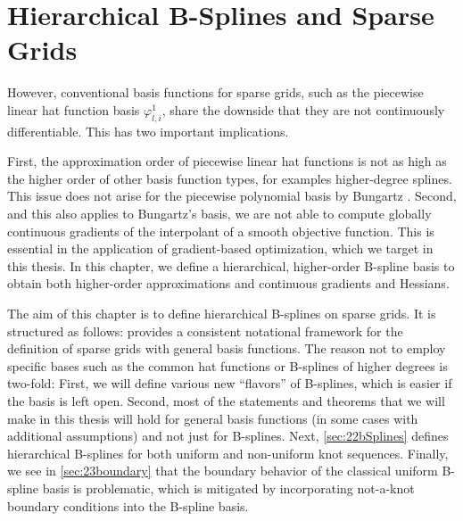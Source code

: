 
\chapter{Hierarchical B-Splines and Sparse Grids}
\label{sec:20sparseGrids}




However, conventional basis functions for sparse grids,
such as the piecewise linear hat function basis $\varphi_{l,i}^1$,
share the downside that they are not continuously differentiable.
This has two important implications.

First, the approximation order of piecewise linear hat functions
is not as high as the higher order of other basis function types,
for examples higher-degree splines.
This issue does not arise for the piecewise polynomial basis
by Bungartz \cite{Bungartz98Finite}.
Second, and this also applies to Bungartz's basis,
we are not able to compute globally continuous gradients of the
interpolant of a smooth objective function.
This is essential in the application of gradient-based optimization,
which we target in this thesis.
In this chapter, we define a hierarchical, higher-order B-spline basis
to obtain both higher-order approximations
and continuous gradients and Hessians.

The aim of this chapter is to define hierarchical B-splines on sparse grids.
It is structured as follows:
 provides a consistent notational framework
for the definition of sparse grids with general basis functions.
The reason not to employ specific bases such as the common hat functions
or B-splines of higher degrees is two-fold:
First, we will define various new ``flavors'' of B-splines,
which is easier if the basis is left open.
Second, most of the statements and theorems that we will make in this
thesis will hold for general basis functions
(in some cases with additional assumptions)
and not just for B-splines.
Next, \cref{sec:22bSplines} defines hierarchical B-splines for both
uniform and non-uniform knot sequences.
Finally, we see in \cref{sec:23boundary} that the boundary behavior
of the classical uniform B-spline basis is problematic,
which is mitigated by incorporating not-a-knot boundary conditions
into the B-spline basis.





